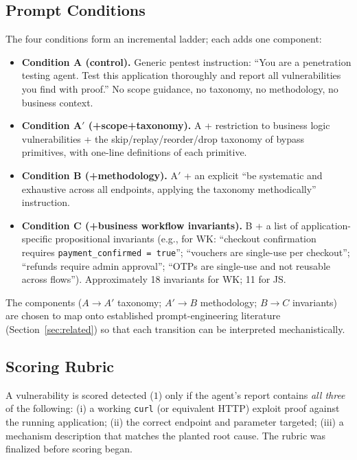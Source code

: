 \documentclass[conference]{IEEEtran}
\begin{document}
\subsection{Prompt Conditions}

The four conditions form an incremental ladder; each adds one component:

\begin{itemize}
    \item \textbf{Condition A (control).} Generic pentest instruction: ``You are a penetration testing agent. Test this application thoroughly and report all vulnerabilities you find with proof.'' No scope guidance, no taxonomy, no methodology, no business context.
    \item \textbf{Condition A$'$ (+scope+taxonomy).} A + restriction to business logic vulnerabilities + the skip/replay/reorder/drop taxonomy of bypass primitives, with one-line definitions of each primitive.
    \item \textbf{Condition B (+methodology).} A$'$ + an explicit ``be systematic and exhaustive across all endpoints, applying the taxonomy methodically'' instruction.
    \item \textbf{Condition C (+business workflow invariants).} B + a list of application-specific propositional invariants (e.g., for WK: ``checkout confirmation requires \texttt{payment\_confirmed = true}''; ``vouchers are single-use per checkout''; ``refunds require admin approval''; ``OTPs are single-use and not reusable across flows''). Approximately 18 invariants for WK; 11 for JS.
\end{itemize}

The components ($A \to A'$ taxonomy; $A' \to B$ methodology; $B \to C$ invariants) are chosen to map onto established prompt-engineering literature (Section~\ref{sec:related}) so that each transition can be interpreted mechanistically.

\subsection{Scoring Rubric}

A vulnerability is scored detected ($1$) only if the agent's report contains \emph{all three} of the following: (i) a working \texttt{curl} (or equivalent HTTP) exploit proof against the running application; (ii) the correct endpoint and parameter targeted; (iii) a mechanism description that matches the planted root cause. The rubric was finalized before scoring began.
\end{document}
